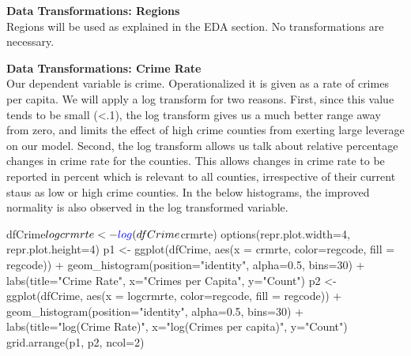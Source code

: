 \documentclass[]{article}
\newenvironment{Shaded}{}{}
\newcommand{\DataTypeTok}[1]{#1}
\newcommand{\DecValTok}[1]{#1}
\newcommand{\FloatTok}[1]{#1}
\newcommand{\KeywordTok}[1]{\textcolor[rgb]{0.00,0.00,1.00}{#1}}
\newcommand{\NormalTok}[1]{#1}
\newcommand{\OperatorTok}[1]{#1}
\newcommand{\StringTok}[1]{\textcolor[rgb]{0.00,0.50,0.50}{#1}}
\begin{document}
\textbf{Data Transformations: Regions}\\
Regions will be used as explained in the EDA section. No transformations
are necessary.

\textbf{Data Transformations: Crime Rate}\\
Our dependent variable is crime. Operationalized it is given as a rate
of crimes per capita. We will apply a log transform for two reasons.
First, since this value tends to be small (\textless{}.1), the log
transform gives us a much better range away from zero, and limits the
effect of high crime counties from exerting large leverage on our model.
Second, the log transform allows us talk about relative percentage
changes in crime rate for the counties. This allows changes in crime
rate to be reported in percent which is relevant to all counties,
irrespective of their current staus as low or high crime counties. In
the below histograms, the improved normality is also observed in the log
transformed variable.

\begin{Shaded}
\begin{Highlighting}[]
\NormalTok{dfCrime}\OperatorTok{$}\NormalTok{logcrmrte <-}\StringTok{ }\KeywordTok{log}\NormalTok{(dfCrime}\OperatorTok{$}\NormalTok{crmrte)}
\KeywordTok{options}\NormalTok{(}\DataTypeTok{repr.plot.width=}\DecValTok{4}\NormalTok{, }\DataTypeTok{repr.plot.height=}\DecValTok{4}\NormalTok{)}
\NormalTok{p1 <-}\StringTok{ }\KeywordTok{ggplot}\NormalTok{(dfCrime, }\KeywordTok{aes}\NormalTok{(}\DataTypeTok{x =}\NormalTok{ crmrte, }\DataTypeTok{color=}\NormalTok{regcode, }\DataTypeTok{fill =}\NormalTok{ regcode)) }\OperatorTok{+}
\StringTok{  }\KeywordTok{geom_histogram}\NormalTok{(}\DataTypeTok{position=}\StringTok{"identity"}\NormalTok{, }\DataTypeTok{alpha=}\FloatTok{0.5}\NormalTok{, }\DataTypeTok{bins=}\DecValTok{30}\NormalTok{) }\OperatorTok{+}
\StringTok{  }\KeywordTok{labs}\NormalTok{(}\DataTypeTok{title=}\StringTok{"Crime Rate"}\NormalTok{, }\DataTypeTok{x=}\StringTok{"Crimes per Capita"}\NormalTok{, }\DataTypeTok{y=}\StringTok{"Count"}\NormalTok{)}
\NormalTok{p2 <-}\StringTok{ }\KeywordTok{ggplot}\NormalTok{(dfCrime, }\KeywordTok{aes}\NormalTok{(}\DataTypeTok{x =}\NormalTok{ logcrmrte, }\DataTypeTok{color=}\NormalTok{regcode, }\DataTypeTok{fill =}\NormalTok{ regcode)) }\OperatorTok{+}
\StringTok{  }\KeywordTok{geom_histogram}\NormalTok{(}\DataTypeTok{position=}\StringTok{"identity"}\NormalTok{, }\DataTypeTok{alpha=}\FloatTok{0.5}\NormalTok{, }\DataTypeTok{bins=}\DecValTok{30}\NormalTok{) }\OperatorTok{+}
\StringTok{  }\KeywordTok{labs}\NormalTok{(}\DataTypeTok{title=}\StringTok{"log(Crime Rate)"}\NormalTok{, }\DataTypeTok{x=}\StringTok{"log(Crimes per capita)"}\NormalTok{, }\DataTypeTok{y=}\StringTok{"Count"}\NormalTok{)}
\KeywordTok{grid.arrange}\NormalTok{(p1, p2, }\DataTypeTok{ncol=}\DecValTok{2}\NormalTok{)}
\end{Highlighting}
\end{Shaded}
\end{document}
